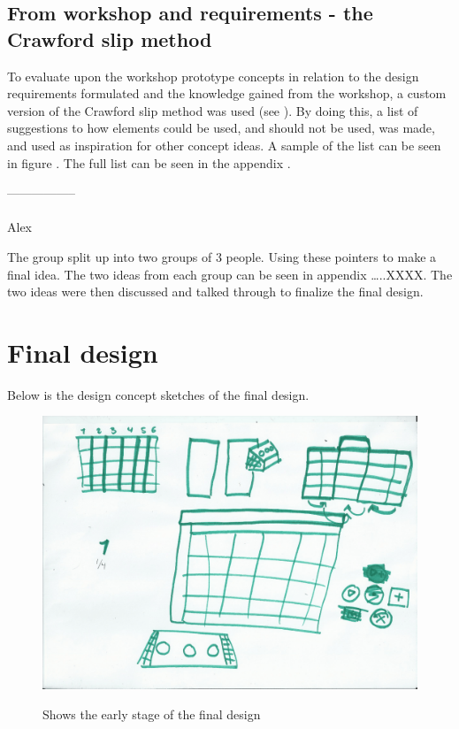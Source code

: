 \subsection{From workshop and requirements - the Crawford slip method}
To evaluate upon the workshop prototype concepts in relation to the design requirements formulated and the knowledge gained from the workshop, a custom version of the Crawford slip method was used (see ). By doing this, a list of suggestions to how elements could be used, and should not be used, was made, and used as inspiration for other concept ideas. A sample of the list can be seen in figure . The full list can be seen in the appendix .  

-----------------\\\\







Alex



The group split up into two groups of 3 people. Using these pointers to make a final idea. 
The two ideas from each group can be seen in appendix …..XXXX. 
The two ideas were then discussed and talked through to finalize the final design. 

\section{Final design}
Below is the design concept sketches of the final design. 

\begin{figure}[H]
	\centering
	\includegraphics[width=0.7\linewidth]{figure/Design/sketchOne}
	\label{fig:sketchOne}
	\caption{Shows the early stage of the final design}
	
\end{figure}


